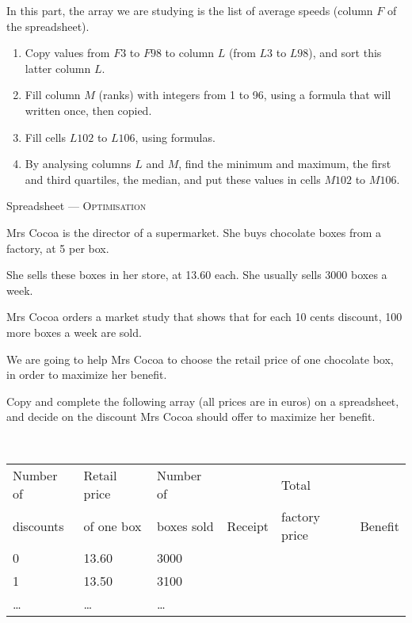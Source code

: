 \documentclass[11pt]{article}
\begin{document}
\begin{question}[Statistics]

  In this part, the array we are studying is the list of average speeds (column $F$ of the spreadsheet).

  \begin{enumerate}
    \item Copy values from $F3$ to $F98$ to column $L$ (from $L3$ to $L98$), and sort this latter column $L$.

    \item Fill column $M$ (ranks) with integers from 1 to 96, using a formula that will written once, then copied.

    \item Fill cells $L102$ to $L106$, using formulas.

    \item By analysing columns $L$ and $M$, find the minimum and maximum, the first and third quartiles, the median, and put these values in cells $M102$ to $M106$.

  \end{enumerate}
\end{question}

\newpage

\begin{center}
  {\large
    Spreadsheet
    ---
    \textsc{Optimisation}
  }
\end{center}

\noindent Mrs Cocoa is the director of a supermarket. She buys chocolate boxes from a factory, at 5 \officialeuro{} per box.

\noindent She sells these boxes in her store, at 13.60 \officialeuro{} each.
She usually sells 3000 boxes a week.

\noindent Mrs Cocoa orders a market study that shows that for each 10 cents discount, 100 more boxes a week are sold.

\noindent We are going to help Mrs Cocoa to choose the retail price of one chocolate box, in order to maximize her benefit.

Copy and complete the following array (all prices are in euros) on a spreadsheet, and decide on the discount Mrs Cocoa should offer to maximize her benefit.

~

{\small
\noindent
\hspace{-2em}
\begin{tabular}{|l|l|l|l|l|l|}
  \hline
  Number of
  & Retail price
  & Number of
  & 
  & Total
  & 
  \\
  discounts
  & of one box
  & boxes sold
  & Receipt
  & factory price
  & Benefit
  \\
  \hline
  0 & 13.60 & 3000 & & & \\
  1 & 13.50 & 3100 & & & \\
  \ldots & \ldots & \ldots & & & \\
  \hline
\end{tabular}
}
\end{document}
